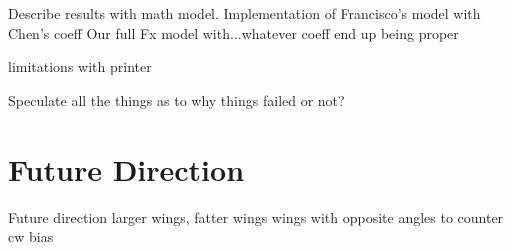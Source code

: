 \documentclass[letterpaper, 11 pt]{article}
\begin{document}
Describe results with math model. 
Implementation of Francisco's model with Chen's coeff
Our full Fx model with...whatever coeff end up being proper

limitations with printer

Speculate all the things as to why things failed or not?

\section{Future Direction}
Future direction
larger wings, fatter wings
wings with opposite angles to counter cw bias





\end{document}
